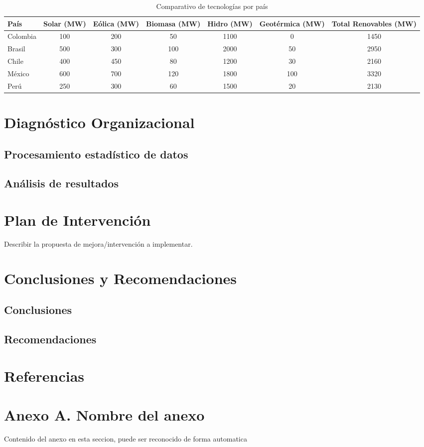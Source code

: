 \documentclass[12pt]{article}
\newcommand{\chapterbreak}{\clearpage \thispagestyle{fancy}}
\begin{document}
\clearpage
\thispagestyle{empty}
\begin{landscape}
\begin{table}[H]
\centering
\caption{Comparativo de tecnologías por país}
\begin{tabular}{|l|c|c|c|c|c|c|}
\hline
País & Solar (MW) & Eólica (MW) & Biomasa (MW) & Hidro (MW) & Geotérmica (MW) & Total Renovables (MW) \\
\hline
Colombia & 100 & 200 & 50 & 1100 & 0 & 1450 \\
Brasil & 500 & 300 & 100 & 2000 & 50 & 2950 \\
Chile & 400 & 450 & 80 & 1200 & 30 & 2160 \\
México & 600 & 700 & 120 & 1800 & 100 & 3320 \\
Perú & 250 & 300 & 60 & 1500 & 20 & 2130 \\
\hline
\end{tabular}
\end{table}
\end{landscape}
\chapterbreak

\section{Diagn\'ostico Organizacional}
\subsection*{Procesamiento estad\'istico de datos}
\subsection*{An\'alisis de resultados}

\chapterbreak

\section{Plan de Intervenci\'on}
Describir la propuesta de mejora/intervenci\'on a implementar.

\chapterbreak

\section{Conclusiones y Recomendaciones}
\subsection*{Conclusiones}
\subsection*{Recomendaciones}

\chapterbreak

\section*{Referencias}
\printbibliography[heading=bibintoc]

\chapterbreak

\appendix
\section*{Anexo A. Nombre del anexo}
Contenido del anexo en esta seccion, puede ser reconocido de forma automatica
\end{document}
